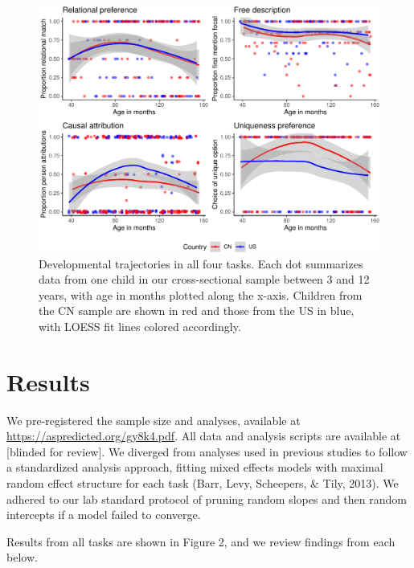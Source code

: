\documentclass[10pt, letterpaper]{article}
\newenvironment{CodeChunk}{}{}
\begin{document}
\begin{CodeChunk}
\begin{figure}[h!]

{\centering \includegraphics[width=1\linewidth]{figs/mega_fig-1} 

}

\caption[Developmental trajectories in all four tasks]{Developmental trajectories in all four tasks. Each dot summarizes data from one child in our cross-sectional sample between 3 and 12 years, with age in months plotted along the x-axis. Children from the CN sample are shown in red and those from the US in blue, with LOESS fit lines colored accordingly.}\label{fig:mega_fig}
\end{figure}
\end{CodeChunk}

\hypertarget{results}{%
\section{Results}\label{results}}

We pre-registered the sample size and analyses, available at
\url{https://aspredicted.org/gy8k4.pdf}. All data and analysis scripts
are available at {[}blinded for review{]}. We diverged from analyses
used in previous studies to follow a standardized analysis approach,
fitting mixed effects models with maximal random effect structure for
each task (Barr, Levy, Scheepers, \& Tily, 2013). We adhered to our lab
standard protocol of pruning random slopes and then random intercepts if
a model failed to converge.

Results from all tasks are shown in Figure 2, and we review findings
from each below.
\end{document}
